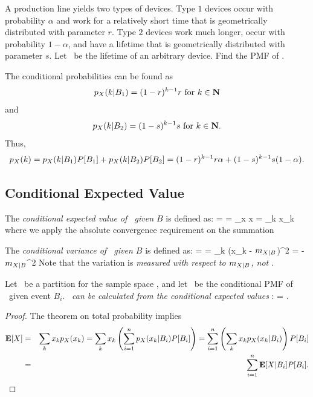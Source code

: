 	\item {}
	A production line yields two types of devices.
	Type $1$ devices occur with probability $\alpha$
	and work for a relatively short time
	that is geometrically distributed with parameter $r$.
	Type $2$ devices work much longer,
	occur with probability $1 - \alpha$,
	and have a lifetime that is geometrically distributed with parameter $s$.
	Let \X\ be the lifetime of an arbitrary device. Find the PMF of \X.

	The conditional probabilities can be found as
	\[
		p_{X}(k|B_1) = (1-r)^{k-1} r \mbox{ for } k \in {\mbox{\bf N}}
	\]
	and
	\[
		p_{X}(k|B_2) = (1-s)^{k-1} s \mbox{ for } k \in {\mbox{\bf N}}.
	\]
	Thus,
	\[ 
		p_{X}(k) = p_{X}(k|B_1) P[B_1] + p_{X}(k|B_2) P[B_2]
		= (1-r)^{k-1} r\alpha
		+ (1-s)^{k-1} s(1-\alpha).
	\]
\eit

\subsection{Conditional Expected Value}
\newcommand{\mxb}{\ensuremath{\expect{X|B}}}
\bit
	\item The \emph{conditional expected value of \X\ given $B$} is defined as:
		 = 
		= \sum_{x\in\ssx} x 
		= \sum_k x_k 
	\eeql
	where we apply the absolute convergence requirement on the summation

	\item The \emph{conditional variance of \X\ given $B$} is defined as:
		= \cExp{(X-\mxb)^2}{B}
		= \sum_k (x_k - \mxb)^2 
		=  - \mxb^2
	\eeql
	Note that the variation is \emph{measured with respect to \mxb, not }.

	\item Let \ be a partition for the sample space \sspace,
	and let \ be the conditional PMF of \X\ given event $B_i$.
	\emph{\ can be calculated from the conditional expected values }:
		 = \sumiton {} .
	\eeql
	\begin{proof}
	The theorem on total probability implies
	\begin{eqnarray*}
		{\bf E}[X] &=& \sum_k x_k p_{X}(x_k)
		= \sum_k x_k \left( \sum_{i=1}^{n} p_{X}(x_k|B_i) P[B_i] \right)
		= \sum_{i=1}^{n} \left( \sum_k x_k p_{X}(x_k|B_i) \right) P[B_i]
		\\&=& \sum_{i=1}^{n} {\bf E}[X|B_i] P[B_i].
	\end{eqnarray*}
	\end{proof}

